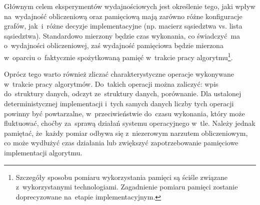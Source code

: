 \documentclass[11pt,a4paper,oneside]{report}
\begin{document}
\begin{center}
\end{center}

Głównym celem eksperymentów wydajnościowych jest określenie tego, jaki wpływ na~wydajność obliczeniową oraz pamięciową mają zarówno różne konfiguracje grafów, jak~i~różne decyzje implementacyjne (np. macierz sąsiedztwa vs. lista sąsiedztwa). Standardowo mierzony będzie czas wykonania, co świadczyć ma o~wydajności obliczeniowej, zaś wydajność pamięciowa będzie mierzona w~oparciu o~faktycznie spożytkowaną pamięć w~trakcie pracy algorytmu\footnote{Szczegóły sposobu pomiaru wykorzystania pamięci są ściśle związane z~wykorzystanymi technologiami. Zagadnienie pomiaru pamięci zostanie doprecyzowane na~etapie implementacyjnym.}.

Oprócz tego warto również zliczać charakterystyczne operacje wykonywane w~trakcie pracy algorytmów. Do~takich operacji można zaliczyć: wpis do~struktury danych, odczyt ze~struktury danych, porównanie. Dla ustalonej deterministycznej implementacji i~tych samych danych liczby tych operacji powinny być powtarzalne, w~przeciwieństwie do~czasu wykonania, który może fluktuować, choćby za~sprawą działań systemu operacyjnego w~tle. Należy jednak pamiętać, że~każdy pomiar odbywa się z~niezerowym narzutem obliczeniowym, co może wydłużyć czas działania lub zwiększyć zapotrzebowanie pamięciowe implementacji algorytmu.
\end{document}
